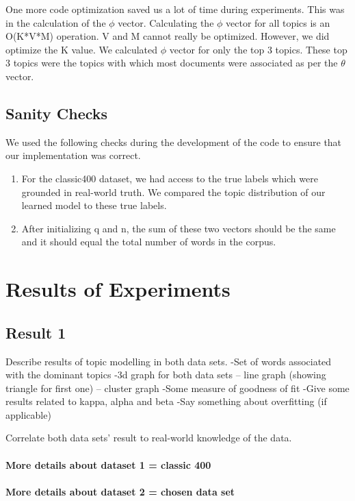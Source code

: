\documentclass[11pt,a4paper,oneside]{article}
\begin{document}
\bigskip
One more code optimization saved us a lot of time during experiments. This was in the calculation of the $\phi$ vector. Calculating the $\phi$ vector for all topics is an O(K*V*M) operation. V and M cannot really be optimized. However, we did optimize the K value. We calculated $\phi$ vector for only the top 3 topics. These top 3 topics were the topics with which most documents were associated as per the $\theta$ vector.


\subsection{Sanity Checks}
We used the following checks during the development of the code to ensure that our implementation was correct.
\begin{enumerate}
\item For the classic400 dataset, we had access to the true labels which were grounded in real-world truth. We compared the topic distribution of our learned model to these true labels. 
\item After initializing q and n, the sum of these two vectors should be the same and it should equal the total number of words in the corpus.
\end{enumerate}

\section{Results of Experiments}
\label{sec:Results}

\subsection{Result 1}
Describe results of topic modelling in both data sets.
-Set of words associated with the dominant topics
-3d graph for both data sets 
	-- line graph (showing triangle for first one)
	-- cluster graph
-Some measure of goodness of fit
-Give some results related to kappa, alpha and beta
-Say something about overfitting (if applicable)

Correlate both data sets' result to real-world knowledge of the data.

\paragraph{More details about dataset 1 = classic 400}
\paragraph{More details about dataset 2 = chosen data set}
\end{document}
